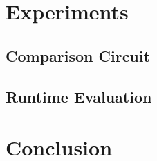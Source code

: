 \documentclass[12pt,twoside]{reedthesis}
\begin{document}
    \chapter{Experiments}
    \section{Comparison Circuit}
    \section{Runtime Evaluation}
    
    
    \chapter{Conclusion} 
    
    
    
    

 

\end{document}

